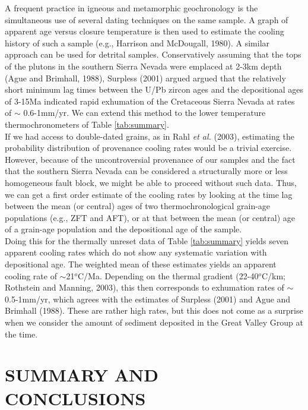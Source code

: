 \documentclass[11pt,twoside]{article}
\begin{document}
A frequent  practice in igneous  and metamorphic geochronology  is the
simultaneous use of  several dating techniques on the  same sample.  A
graph  of apparent  age versus  closure  temperature is  then used  to
estimate  the cooling  history of  such  a sample  (e.g., Harrison  and
McDougall,  1980).   A  similar  approach  can be  used  for  detrital
samples.  Conservatively assuming that the  tops of the plutons in the
southern  Sierra  Nevada  were  emplaced  at  2-3km  depth  (Ague  and
Brimhall,  1988), Surpless  (2001) argued  argued that  the relatively
short  minimum  lag  times  between  the  U/Pb  zircon  ages  and  the
depositional  ages  of  3-15Ma   indicated  rapid  exhumation  of  the
Cretaceous Sierra Nevada at rates  of $\sim$ 0.6-1mm/yr. We can extend
this  method  to the  lower  temperature  thermochronometers of  Table
\ref{tab:summary}.\\

If  we had  access to  double-dated grains,  as in  Rahl {\it  et al.}
(2003), estimating the  probability distribution of provenance cooling
rates  would   be  a  trivial  exercise.   However,   because  of  the
uncontroversial  provenance  of our  samples  and  the  fact that  the
southern Sierra Nevada  can be considered a structurally  more or less
homogeneous  fault block,  we might  be able  to proceed  without such
data. Thus, we can get a  first order estimate of the cooling rates by
looking at  the time  lag between  the mean (or  central) ages  of two
thermochronological grain-age  populations (e.g.,  ZFT and AFT),  or at
that between the  mean (or central) age of  a grain-age population and
the depositional age of the sample.\\

Doing this  for the thermally unreset data  of Table \ref{tab:summary}
yields seven apparent  cooling rates which do not  show any systematic
variation with depositional age.  The weighted mean of these estimates
yields an apparent cooling  rate of $\sim$21$^o$C/Ma. Depending on the
thermal  gradient (22-40$^o$C/km; Rothstein  and Manning,  2003), this
then corresponds to exhumation rates of $\sim$0.5-1mm/yr, which agrees
with the  estimates of Surpless  (2001) and Ague and  Brimhall (1988).
These are rather high rates, but this does not come as a surprise when
we consider the amount of sediment deposited in the Great Valley Group
at the time.

\section*{\uppercase{Summary and conclusions}}
\end{document}
